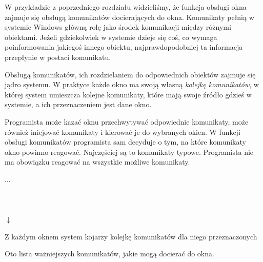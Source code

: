 W przykładzie z poprzedniego rozdziału widzieliśmy, że funkcja obsługi okna zajmuje się obsługą
komunikatów docierających do okna. Komunikaty pełnią w systemie Windows główną rolę jako środek
komunikacji między różnymi obiektami. Jeżeli gdziekolwiek w systemie dzieje się coś, co wymaga
poinformowania jakiegoś innego obiektu, najprawdopodobniej ta informacja przepłynie w postaci
komunikatu.

Obsługą komunikatów, ich rozdzielaniem do odpowiednich obiektów zajmuje się jądro systemu. 
W praktyce każde okno ma swoją własną {\em kolejkę komunikatów},
w której system umieszcza kolejne komunikaty, które mają swoje źródło gdzieś w systemie, a ich
przeznaczeniem jest dane okno. 

Programista może kazać oknu przechwytywać odpowiednie komunikaty, może również inicjować komunikaty
i kierować je do wybranych okien. W funkcji obsługi komunikatów programista sam decyduje o tym, na które
komunikaty okno powinno reagować. Najczęściej są to komunikaty typowe. Programista nie ma obowiązku reagować
na wszystkie możliwe komunikaty.

\begin{table}[ht]
	\begin{center}

	\mbox{$\ldots$}             \\ 
	  \\ 
	  \\ 
	  \\ 
	 $\downarrow$                \\
	\end{center}
\caption{Z każdym oknem system kojarzy kolejkę komunikatów dla niego przeznaczonych} 
\end{table}

Oto lista ważniejszych komunikatów, jakie mogą docierać do okna.

